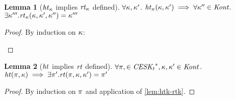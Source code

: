 \documentclass{article}
\newtheorem{lemma}{Lemma}
\begin{document}
\begin{lemma}[$\mathit{ht}_{\kappa}$ implies $\mathit{rt}_{\kappa}$ defined]\label{lem:htk-rtk}
  $\forall \kappa,\kappa'$.
  $\mathit{ht}_{\kappa}(\kappa,\kappa') \implies \forall \kappa'' \in \mathit{Kont}.$
  $\exists \kappa'''. \mathit{rt}_{\kappa}(\kappa,\kappa',\kappa'') = \kappa'''$
\end{lemma}
\begin{proof}
  By induction on $\kappa$:
  \begin{byCases}
  \end{byCases}
\end{proof}

\begin{lemma}[$\mathit{ht}$ implies $\mathit{rt}$ defined]\label{lem:ht-rt}
  $\forall \pi ,\in \mathit{CESK_t}^*, \kappa,\kappa' \in \mathit{Kont}$. $\mathit{ht}(\pi,\kappa) \implies \exists \pi'. \mathit{rt}(\pi,\kappa,\kappa') = \pi'$
\end{lemma}
\begin{proof}
  By induction on $\pi$ and application of \autoref{lem:htk-rtk}.
\end{proof}
\end{document}

